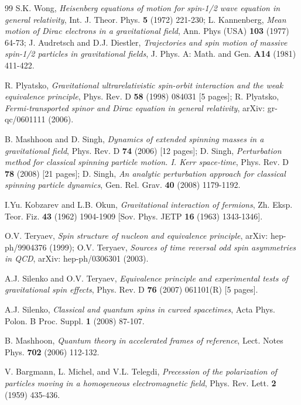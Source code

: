 \documentclass[preprint,showpacs,preprintnumbers,amsmath,amssymb]{revtex4}
\begin{document}
\begin{thebibliography}{99}
S.K. Wong,
{\it Heisenberg equations of motion for spin-1/2 wave equation
in general relativity},
Int. J. Theor. Phys. {\bf 5} (1972) 221-230;
L. Kannenberg,
{\it Mean motion of Dirac electrons in a gravitational field},
Ann. Phys (USA) {\bf 103} (1977) 64-73;
J. Audretsch and D.J. Diestler,
{\it Trajectories and spin motion of massive spin-1/2 particles
in gravitational fields},
J. Phys. A: Math. and Gen. {\bf A14} (1981) 411-422.

R. Plyatsko, {\it Gravitational ultrarelativistic spin-orbit 
interaction and the weak equivalence principle},
Phys. Rev. D \textbf{58} (1998) 084031 [5 pages];
R. Plyatsko, {\it Fermi-transported spinor and Dirac 
equation in general relativity}, arXiv: gr-qc/0601111 (2006).

B. Mashhoon and D. Singh,
{\it Dynamics of extended spinning masses in a gravitational field},
Phys. Rev. D {\bf 74} (2006) [12 pages];
D. Singh,
{\it Perturbation method for classical spinning particle motion.
I. Kerr space-time},
Phys. Rev. D {\bf 78} (2008) [21 pages];
D. Singh,
{\it An analytic perturbation approach for classical spinning
particle dynamics},
Gen. Rel. Grav. {\bf 40} (2008) 1179-1192.

I.Yu. Kobzarev and L.B. Okun,
{\it Gravitational interaction of fermions}, 
Zh. Eksp. Teor. Fiz. {\bf 43} (1962) 1904-1909 
[Sov. Phys. JETP {\bf 16} (1963) 1343-1346].

O.V. Teryaev,
{\it Spin structure of nucleon and equivalence principle},
arXiv: hep-ph/9904376 (1999); O.V. Teryaev, 
{\it Sources of time reversal odd spin asymmetries in QCD},
arXiv: hep-ph/0306301 (2003).

A.J. Silenko and O.V. Teryaev, 
{\it Equivalence principle and experimental tests of gravitational
spin effects}, Phys. Rev. D {\bf 76} (2007) 061101(R) [5 pages].

A.J. Silenko,
{\it Classical and quantum spins in curved spacetimes},
Acta Phys. Polon. B Proc. Suppl. {\bf 1} (2008) 87-107.

B. Mashhoon,
{\it Quantum theory in accelerated frames of reference}, 
Lect. Notes Phys. {\bf 702} (2006) 112-132.

V. Bargmann, L. Michel, and V.L. Telegdi,
{\it Precession of the polarization
of particles moving in a homogeneous electromagnetic field},
Phys. Rev. Lett. {\bf 2} (1959) 435-436.


\end{thebibliography}
\end{document}
